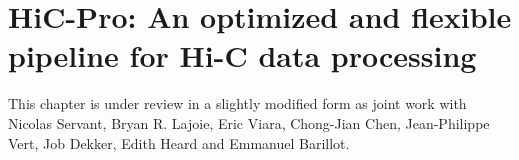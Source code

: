 \chapter{HiC-Pro: An optimized and flexible pipeline for Hi-C data
processing}

\graphicspath{{10_hicpro/}}

\begin{work}

This chapter is under review in a slightly modified form as joint work with
Nicolas Servant, Bryan R. Lajoie, Eric Viara, Chong-Jian Chen, Jean-Philippe
Vert, Job Dekker, Edith Heard and Emmanuel Barillot.

\end{work}

